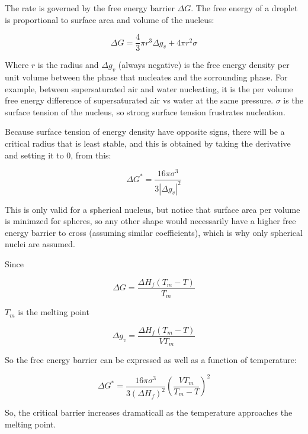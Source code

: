 \documentclass{article}
\begin{document}
The rate is governed by the free energy barrier $\Delta G$. The free energy of a droplet is proportional to surface area and volume of the nucleus:

\[\Delta G=\frac{4}{3}\pi r^3 \Delta g_v + 4\pi r^2 \sigma\]

Where $r$ is the radius and $\Delta g_v$ (always negative) is the free energy density per unit volume between the phase that nucleates and the sorrounding phase. For example, between supersaturated air and water nucleating, it is the per volume free energy difference of supersaturated air vs water at the same pressure. $\sigma$ is the surface tension of the nucleus, so strong surface tension frustrates nucleation.

Because surface tension of energy density have opposite signs, there will be a critical radius that is least stable, and this is obtained by taking the derivative and setting it to 0, from this:

\[\Delta G^* = \frac{16\pi \sigma^3}{3|\Delta g_v|^2}\]

This is only valid for a spherical nucleus, but notice that surface area per volume is minimzed for spheres, so any other shape would necessarily have a higher free energy barrier to cross (assuming similar coefficients), which is why only spherical nuclei are assumed.

Since

\[\Delta G = \frac{\Delta H_f (T_m - T)}{T_m}\]

$T_m$ is the melting point

\[\Delta g_v = \frac{\Delta H_f (T_m - T)}{V T_m}\]

So the free energy barrier can be expressed as well as a function of temperature:

\[\Delta G^* = \frac{16\pi \sigma ^3}{3(\Delta H_f)^2}\left(\frac{VT_m}{T_m-T}\right)^2\]

So, the critical barrier increases dramaticall as the temperature approaches the melting point.
\end{document}
